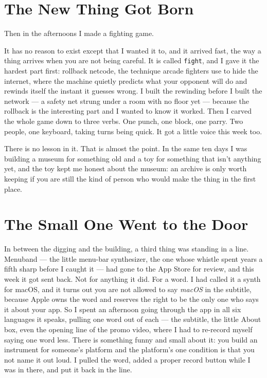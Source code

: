 \documentclass[11pt,letterpaper]{article}
\begin{document}
\section{The New Thing Got Born}

Then in the afternoons I made a fighting game.

It has no reason to exist except that I wanted it to, and it arrived fast, the way a thing arrives when you are not being careful. It is called \texttt{fight}, and I gave it the hardest part first: rollback netcode, the technique arcade fighters use to hide the internet, where the machine quietly predicts what your opponent will do and rewinds itself the instant it guesses wrong. I built the rewinding before I built the network --- a safety net strung under a room with no floor yet --- because the rollback is the interesting part and I wanted to know it worked. Then I carved the whole game down to three verbs. One punch, one block, one parry. Two people, one keyboard, taking turns being quick. It got a little voice this week too.

There is no lesson in it. That is almost the point. In the same ten days I was building a museum for something old and a toy for something that isn't anything yet, and the toy kept me honest about the museum: an archive is only worth keeping if you are still the kind of person who would make the thing in the first place.

\section{The Small One Went to the Door}

In between the digging and the building, a third thing was standing in a line. Menuband --- the little menu-bar synthesizer, the one whose whistle spent years a fifth sharp before I caught it --- had gone to the App Store for review, and this week it got sent back. Not for anything it did. For a word. I had called it a synth for macOS, and it turns out you are not allowed to say \textit{macOS} in the subtitle, because Apple owns the word and reserves the right to be the only one who says it about your app. So I spent an afternoon going through the app in all six languages it speaks, pulling one word out of each --- the subtitle, the little About box, even the opening line of the promo video, where I had to re-record myself saying one word less. There is something funny and small about it: you build an instrument for someone's platform and the platform's one condition is that you not name it out loud. I pulled the word, added a proper record button while I was in there, and put it back in the line.
\end{document}
